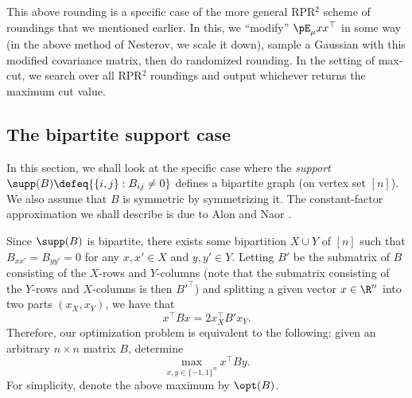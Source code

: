 	This above rounding is a specific case of the more general RPR$^2$ scheme of roundings that we mentioned earlier. In this, we ``modify'' $\pE_\mu xx^\top$ in some way (in the above method of Nesterov, we scale it down), sample a Gaussian with this modified covariance matrix, then do randomized rounding. In the setting of max-cut, we search over all RPR$^2$ roundings and output whichever returns the maximum cut value.

\subsection{The bipartite support case}

	In this section, we shall look at the specific case where the \emph{support} $\supp(B) \defeq \{ \{i,j\} : B_{ij} \ne 0\}$ defines a bipartite graph (on vertex set $[n]$). We also assume that $B$ is symmetric by symmetrizing it. The constant-factor approximation we shall describe is due to Alon and Naor \cite{grothendieck-alon-naor}.

	Since $\supp(B)$ is bipartite, there exists some bipartition $X \cup Y$ of $[n]$ such that $B_{xx'} = B_{yy'} = 0$ for any $x,x' \in X$ and $y,y' \in Y$. Letting $B'$ be the submatrix of $B$ consisting of the $X$-rows and $Y$-columns (note that the submatrix consisting of the $Y$-rows and $X$-columns is then $B'^\top$) and splitting a given vector $x \in \R^{n}$ into two parts $(x_X,x_Y)$, we have that
	\[ x^\top B x = 2x_X^\top B' x_Y. \]
	Therefore, our optimization problem is equivalent to the following: given an arbitrary $n \times n$ matrix $B$, determine
	\[ \max_{x,y \in \{-1,1\}^n} x^\top B y. \]
	For simplicity, denote the above maximum by $\opt(B)$.\\

